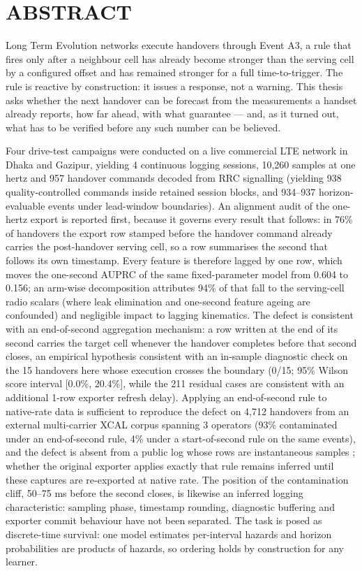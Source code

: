 \chapter*{ABSTRACT}

Long Term Evolution networks execute handovers through Event A3, a rule that fires only after a neighbour cell has already become stronger than the serving cell by a configured offset and has remained stronger for a full time-to-trigger. The rule is reactive by construction: it issues a response, not a warning. This thesis asks whether the next handover can be forecast from the measurements a handset already reports, how far ahead, with what guarantee --- and, as it turned out, what has to be verified before any such number can be believed.

Four drive-test campaigns were conducted on a live commercial LTE network in Dhaka and Gazipur, yielding 4 continuous logging sessions, 10,260 samples at one hertz and 957 handover commands decoded from RRC signalling (yielding 938 quality-controlled commands inside retained session blocks, and 934--937 horizon-evaluable events under lead-window boundaries). An alignment audit of the one-hertz export is reported first, because it governs every result that follows: in 76\% of handovers the export row stamped before the handover command already carries the post-handover serving cell, so a row summarises the second that follows its own timestamp. Every feature is therefore lagged by one row, which moves the one-second AUPRC of the same fixed-parameter model from 0.604 to 0.156; an arm-wise decomposition attributes 94\% of that fall to the serving-cell radio scalars (where leak elimination and one-second feature ageing are confounded) and negligible impact to lagging kinematics. The defect is consistent with an end-of-second aggregation mechanism: a row written at the end of its second carries the target cell whenever the handover completes before that second closes, an empirical hypothesis consistent with an in-sample diagnostic check on the 15 handovers here whose execution crosses the boundary (0/15; 95\% Wilson score interval [0.0\%, 20.4\%], while the 211 residual cases are consistent with an additional 1-row exporter refresh delay). Applying an end-of-second rule to native-rate data is sufficient to reproduce the defect on 4,712 handovers from an external multi-carrier XCAL corpus spanning 3 operators \cite{ref40} (93\% contaminated under an end-of-second rule, 4\% under a start-of-second rule on the same events), and the defect is absent from a public log whose rows are instantaneous samples \cite{ref37}; whether the original exporter applies exactly that rule remains inferred until these captures are re-exported at native rate. The position of the contamination cliff, 50--75 ms before the second closes, is likewise an inferred logging characteristic: sampling phase, timestamp rounding, diagnostic buffering and exporter commit behaviour have not been separated. The task is posed as discrete-time survival: one model estimates per-interval hazards and horizon probabilities are products of hazards, so ordering holds by construction for any learner.

